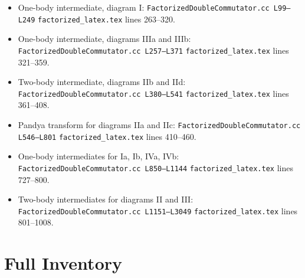 \documentclass{article}
\begin{document}
\begin{itemize}
\item One-body intermediate, diagram I:
  \texttt{FactorizedDoubleCommutator.cc L99--L249}
  \newline
  \texttt{factorized\_latex.tex} lines 263--320.
\item One-body intermediate, diagrams IIIa and IIIb:
  \texttt{FactorizedDoubleCommutator.cc L257--L371}
  \newline
  \texttt{factorized\_latex.tex} lines 321--359.
\item Two-body intermediate, diagrams IIb and IId:
  \texttt{FactorizedDoubleCommutator.cc L380--L541}
  \newline
  \texttt{factorized\_latex.tex} lines 361--408.
\item Pandya transform for diagrams IIa and IIc:
  \texttt{FactorizedDoubleCommutator.cc L546--L801}
  \newline
  \texttt{factorized\_latex.tex} lines 410--460.
\item One-body intermediates for Ia, Ib, IVa, IVb:
  \texttt{FactorizedDoubleCommutator.cc L850--L1144}
  \newline
  \texttt{factorized\_latex.tex} lines 727--800.
\item Two-body intermediates for diagrams II and III:
  \texttt{FactorizedDoubleCommutator.cc L1151--L3049}
  \newline
  \texttt{factorized\_latex.tex} lines 801--1008.
\end{itemize}

\section*{Full Inventory}
\end{document}
